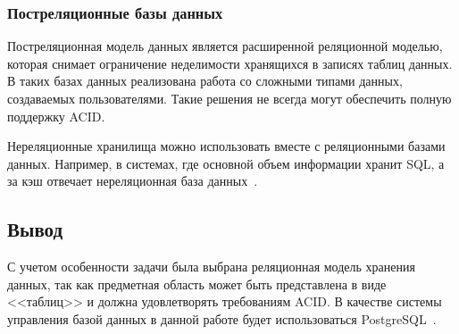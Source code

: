  
\subsubsection{Постреляционные базы данных}

Постреляционная модель данных является расширенной реляционной моделью, которая снимает ограничение неделимости хранящихся в записях таблиц данных. В таких базах данных реализована работа со сложными типами данных, создаваемых пользователями. Такие решения не всегда могут обеспечить полную поддержку ACID. 

Нереляционные хранилища можно использовать вместе с реляционными базами данных. Например, в системах, где основной объем информации хранит SQL, а за кэш отвечает нереляционная база данных~\cite{amazon}.

\subsection*{Вывод}

С учетом особенности задачи была выбрана реляционная модель хранения данных, так как предметная область может быть представлена в виде <<таблиц>> и должна удовлетворять требованиям ACID. В качестве системы управления базой данных в данной работе будет использоваться PostgreSQL~\cite{postgres}.
